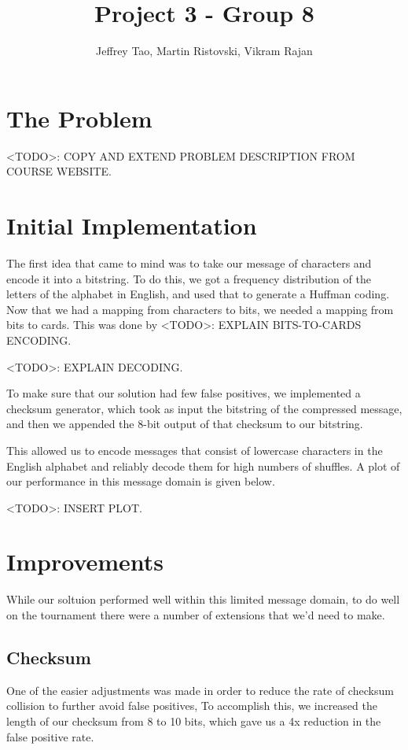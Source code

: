 \documentclass{article}
\title{Project 3 - Group 8}
\author{Jeffrey Tao, Martin Ristovski, Vikram Rajan}
\begin{document}
\maketitle

\tableofcontents

\pagebreak

\section{The Problem}

<TODO>: COPY AND EXTEND PROBLEM DESCRIPTION FROM COURSE WEBSITE.

\section{Initial Implementation}

The first idea that came to mind was to take our message of characters and encode it into a bitstring. To do this, we got a frequency distribution of the letters of the alphabet in English, and used that to generate a Huffman coding. Now that we had a mapping from characters to bits, we needed a mapping from bits to cards. This was done by <TODO>: EXPLAIN BITS-TO-CARDS ENCODING.

<TODO>: EXPLAIN DECODING.

To make sure that our solution had few false positives, we implemented a checksum generator, which took as input the bitstring of the compressed message, and then we appended the 8-bit output of that checksum to our bitstring.

This allowed us to encode messages that consist of lowercase characters in the English alphabet and reliably decode them for high numbers of shuffles. A plot of our performance in this message domain is given below.

<TODO>: INSERT PLOT.

\section{Improvements}

While our soltuion performed well within this limited message domain, to do well on the tournament there were a number of extensions that we'd need to make. 

\subsection{Checksum}
One of the easier adjustments was made in order to reduce the rate of checksum collision to further avoid false positives, To accomplish this, we increased the length of our checksum from 8 to 10 bits, which gave us a 4x reduction in the false positive rate.
\end{document}
